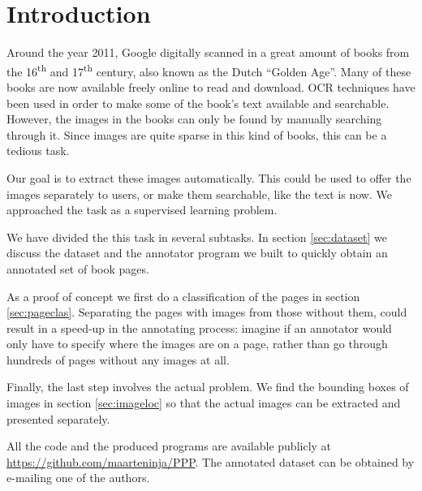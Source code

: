 \section{Introduction}
\label{sec:introduction}

%
Around the year 2011, Google digitally scanned in a great amount of books from
the 16\textsuperscript{th} and 17\textsuperscript{th}
century\cite{bloomburg2011}, also known as the Dutch ``Golden Age''. Many of
these books are now available freely online to read and download. OCR techniques
have been used in order to make some of the book's text available and
searchable. However, the images in the books can only be found by manually
searching through it. Since images are quite sparse in this kind of books,
this can be a tedious task.

Our goal is to extract these images automatically. This could be used to offer
the images separately to users, or make them searchable, like the text is
now. We approached the task as a supervised learning problem.

We have divided the this task in several subtasks. In section
\ref{sec:dataset} we discuss the dataset and the annotator program we built to
quickly obtain an annotated set of book pages.

As a proof of concept we first do a classification of the pages in
section \ref{sec:pageclas}.  Separating the pages with images from those without
them, could result in a speed-up in the annotating process: imagine if an
annotator would only have to specify where the images are on a page, rather than
go through hundreds of pages without any images at all.

Finally, the last step involves the actual problem. We find the bounding boxes of
images in section \ref{sec:imageloc} so that the actual images can be extracted
and presented separately.

All the code and the produced programs are available publicly at
\url{https://github.com/maarteninja/PPP}. The annotated dataset can be obtained
by e-mailing one of the authors.

